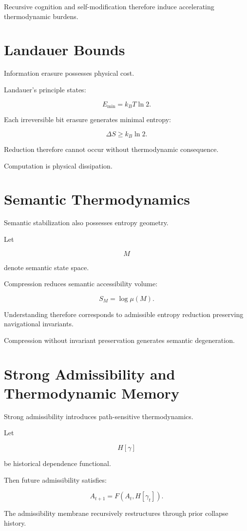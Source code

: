 \documentclass[12pt,openany]{book}
\theoremstyle{plain}
\theoremstyle{definition}
\theoremstyle{remark}
\begin{document}
Recursive cognition and self-modification therefore induce
accelerating thermodynamic burdens.

\section{Landauer Bounds}

Information erasure possesses physical cost.

Landauer's principle states:

\[
E_{\min}
=
k_B T \ln 2.
\]

Each irreversible bit erasure generates minimal entropy:

\[
\Delta S
\geq
k_B \ln 2.
\]

Reduction therefore cannot occur without thermodynamic
consequence.

Computation is physical dissipation.

\section{Semantic Thermodynamics}

Semantic stabilization also possesses entropy geometry.

Let

\[
M
\]

denote semantic state space.

Compression reduces semantic accessibility volume:

\[
S_M
=
\log\mu(M).
\]

Understanding therefore corresponds to admissible entropy
reduction preserving navigational invariants.

Compression without invariant preservation generates semantic
degeneration.

\section{Strong Admissibility and Thermodynamic Memory}

Strong admissibility introduces path-sensitive thermodynamics.

Let

\[
H[\gamma]
\]

be historical dependence functional.

Then future admissibility satisfies:

\[
A_{t+1}
=
F(A_t,H[\gamma_t]).
\]

The admissibility membrane recursively restructures through prior
collapse history.
\end{document}
